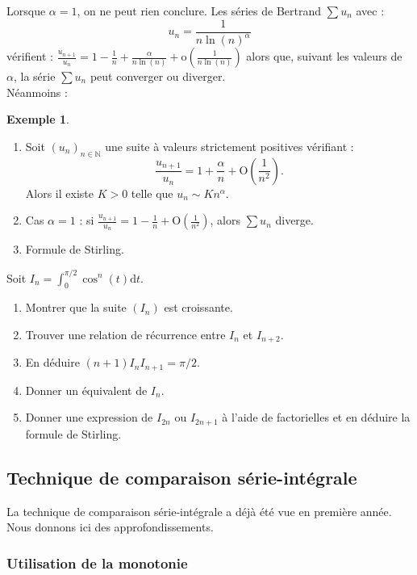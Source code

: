 \documentclass[french]{article}
\newcommand{\N}{\mathbb{N}}
\renewcommand{\o}{\text{o}}
\renewcommand{\O}{\text{O}}
\renewcommand{\d}{\text{d}}
\theoremstyle{plain}
\theoremstyle{definition}
\newtheorem*{ex}{Exemple}
\theoremstyle{remark}
\begin{document}
Lorsque $\alpha=1$, on ne peut rien conclure. Les séries de Bertrand $\displaystyle\sum u_n$ avec : $$u_n=\frac{1}{n\ln(n)^\alpha}$$ vérifient : $\displaystyle\frac{u_{n+1}}{u_n}=1-\frac{1}{n}+\frac{\alpha}{n\ln(n)}+\o\left(\frac{1}{n\ln(n)}\right)$ alors que, suivant les valeurs de $\alpha$, la série $\displaystyle\sum u_n$ peut converger ou diverger. \\

Néanmoins : 
\begin{ex}
	\begin{enumerate}
		\item Soit $(u_n)_{n\in\N}$ une suite à valeurs strictement positives vérifiant : $$\frac{u_{n+1}}{u_n}=1+\frac{\alpha}{n}+\O\left(\frac{1}{n^2}\right).$$ Alors il existe $K>0$ telle que $u_n\sim Kn^\alpha$.
		\item Cas $\alpha=1$ : si $\displaystyle\frac{u_{n+1}}{u_n}=1-\frac{1}{n}+\O\left(\frac{1}{n^2}\right)$, alors $\displaystyle\sum u_n$ diverge.
		\item Formule de Stirling.
	\end{enumerate}
\end{ex}

\begin{exo}
	Soit $I_n=\displaystyle\int_{0}^{\pi/2}\cos^n(t)\d t$.
	\begin{enumerate}
		\item Montrer que la suite $(I_n)$ est croissante.
		\item Trouver une relation de récurrence entre $I_n$ et $I_{n+2}$.
		\item En déduire $(n+1)I_nI_{n+1}=\pi/2$.
		\item Donner un équivalent de $I_n$.
		\item Donner une expression de $I_{2n}$ ou $I_{2n+1}$ à l'aide de factorielles et en déduire la formule de Stirling.
	\end{enumerate}
\end{exo}

\subsection{Technique de comparaison série-intégrale}

La technique de comparaison série-intégrale a déjà été vue en première année. Nous donnons ici des approfondissements.

\subsubsection*{Utilisation de la monotonie}
\end{document}
